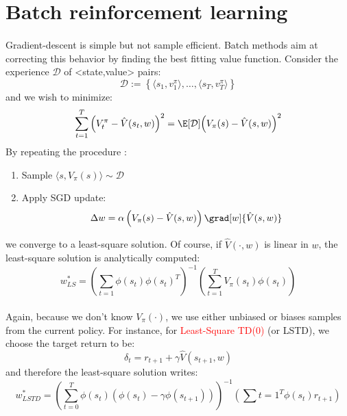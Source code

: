 \documentclass[a4paper]{article}
\newcommand\vhat{\hat{V}(s,w)}
\begin{document}
	\section{Batch reinforcement learning}
	{
		\paragraph{} Gradient-descent is simple but not sample efficient. Batch methods aim at correcting this behavior by finding the best fitting value function. Consider the experience $\mathcal{D}$ of <state,value> pairs:
		\begin{equation}
			\mathcal{D} := \left\{ \langle s_1,v_1^\pi\rangle, \hdots, \langle s_T,v_T^\pi\rangle\right\}
		\end{equation} 
		and we wish to minimize:
		\begin{equation}
			\sum_{t=1}^T \left( V_t^\pi - \hat{V}(s_t,w)\right)^2 = \E[\mathcal{D}]{\left(V_\pi(s) - \hat{V}(s,w)\right)^2}
		\end{equation}
		By repeating the procedure : 
		\begin{enumerate}
			\item Sample $\langle s,V_\pi(s)\rangle \sim \mathcal{D} $
			\item Apply SGD update:
			\begin{equation}
				\Delta w = \alpha \left(V_\pi(s) - \hat{V}(s,w)\right)\grad[w]{\vhat}
			\end{equation}
		\end{enumerate}
		we converge to a least-square solution. Of course, if $\hat{V}(\cdot,w)$ is linear in $w$, the least-square solution is analytically computed:
		\begin{equation}
			w_{LS}^* = \left( \sum_{t=1} \phi(s_t)\phi(s_t)^T\right)^{-1}\left(\sum_{t=1}^T V_\pi(s_t)\phi(s_t)\right)
		\end{equation}
		
		\paragraph{} Again, because we don't know $V_\pi(\cdot)$, we use either unbiased or biases samples from the current policy. For instance, for \textcolor{red}{Least-Square TD(0)} (or LSTD), we choose the target return to be:
		\begin{equation}
			\delta_t = r_{t+1} + \gamma \hat{V}(s_{t+1},w)
		\end{equation}
		and therefore the least-square solution writes:
		\begin{equation}
			w_{LSTD}^* = \left( \sum_{t=0}^T \phi(s_t)\left( \phi(s_t) - \gamma \phi(s_{t+1})\right)\right)^{-1}\left( \sum{t=1}^T \phi(s_t)r_{t+1}\right)
		\end{equation}
		
}
\end{document}
